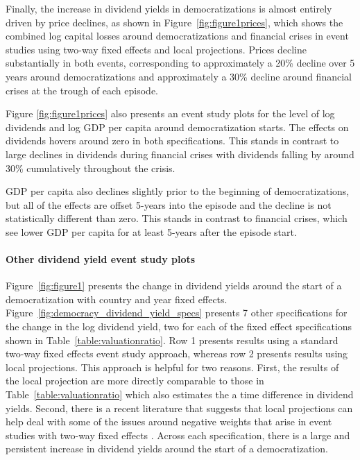 \documentclass[12pt]{article}
\numberwithin{equation}{section}
\begin{document}
Finally, the increase in dividend yields in democratizations is almost entirely driven by price declines, as shown in Figure~\ref{fig:figure1prices}, which shows the combined log capital losses around democratizations and financial crises in event studies using two-way fixed effects and local projections. Prices decline substantially in both events, corresponding to approximately a 20\% decline over 5 years around democratizations and approximately a 30\% decline around financial crises at the trough of each episode.

Figure \ref{fig:figure1prices} also presents an event study plots for the level of log dividends and log GDP per capita around democratization starts. The effects on dividends hovers around zero in both specifications. This stands in contrast to large declines in dividends during financial crises with dividends falling by around 30\% cumulatively throughout the crisis.

GDP per capita also declines slightly prior to the beginning of democratizations, but all of the effects are offset 5-years into the episode and the decline is not statistically different than zero. This stands in contrast to financial crises, which see lower GDP per capita for at least 5-years after the episode start.

\paragraph{Other dividend yield event study plots}

Figure~\ref{fig:figure1} presents the change in dividend yields around the start of a democratization with country and year fixed effects. Figure~\ref{fig:democracy_dividend_yield_specs} presents 7 other specifications for the change in the log dividend yield, two for each of the fixed effect specifications shown in Table~\ref{table:valuationratio}. Row 1 presents results using a standard two-way fixed effects event study approach, whereas row 2 presents results using \cite{Jorda2005} local projections. This approach is helpful for two reasons. First, the results of the local projection are more directly comparable to those in Table~\ref{table:valuationratio} which also estimates the a time difference in dividend yields. Second, there is a recent literature that suggests that local projections can help deal with some of the issues around negative weights that arise in event studies with two-way fixed effects \cite{Dube2025}. Across each specification, there is a large and persistent increase in dividend yields around the start of a democratization. 
\end{document}
